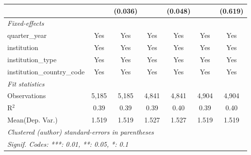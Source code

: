 \begin{tabular}{lcccccc}
                                      &               & (0.036)       &               & (0.048)       &              & (0.619)\\   
   \midrule
   \emph{Fixed-effects}\\
   quarter\_year                      & Yes           & Yes           & Yes           & Yes           & Yes          & Yes\\  
   institution                        & Yes           & Yes           & Yes           & Yes           & Yes          & Yes\\  
   institution\_type                  & Yes           & Yes           & Yes           & Yes           & Yes          & Yes\\  
   institution\_country\_code         & Yes           & Yes           & Yes           & Yes           & Yes          & Yes\\  
   \midrule
   \emph{Fit statistics}\\
   Observations                       & 5,185         & 5,185         & 4,841         & 4,841         & 4,904        & 4,904\\  
   R$^2$                              & 0.39          & 0.39          & 0.39          & 0.40          & 0.39         & 0.40\\  
Mean(Dep. Var.) & 1.519 & 1.519 & 1.527 & 1.527 & 1.519 & 1.519 \\
   \midrule \midrule
   \multicolumn{7}{l}{\emph{Clustered (author) standard-errors in parentheses}}\\
   \multicolumn{7}{l}{\emph{Signif. Codes: ***: 0.01, **: 0.05, *: 0.1}}\\
\end{tabular}
\par\endgroup
